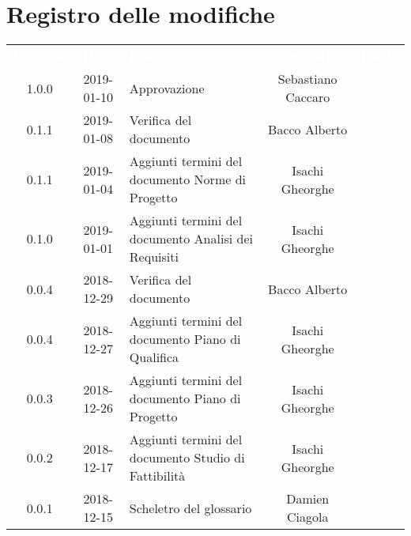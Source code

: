 
\section*{Registro delle modifiche}
{
	\renewcommand{\arraystretch}{1.5}
	\centering
	\begin{longtable}{ c c  C{4cm}  c  c }
		
		\textcolor{white}{\textbf{Versione}} & \textcolor{white}{\textbf{Data}} & \textcolor{white}{\textbf{Descrizione}} & \textcolor{white}{\textbf{Nominativo}} & \textcolor{white}{\textbf{Ruolo}}\\
		
		1.0.0 & 2019-01-10 & Approvazione & Sebastiano Caccaro & \Res{}\\
						
		0.1.1 & 2019-01-08 & Verifica del documento & Bacco Alberto & \ver{}\\
		
		0.1.1 & 2019-01-04 & Aggiunti termini del documento Norme di Progetto & Isachi Gheorghe &\ana{}\\
		
		0.1.0 & 2019-01-01 & Aggiunti termini del documento Analisi dei Requisiti & Isachi Gheorghe &\ana{}\\
		
		0.0.4 & 2018-12-29 & Verifica del documento & Bacco Alberto & \ver{}\\
				
		0.0.4 & 2018-12-27 & Aggiunti termini del documento Piano di Qualifica & Isachi Gheorghe &\ana{}\\
				
		0.0.3 & 2018-12-26 &Aggiunti termini del documento Piano di Progetto & Isachi Gheorghe & \ana{}\\
				
		0.0.2 & 2018-12-17 & Aggiunti termini del documento Studio di Fattibilità & Isachi Gheorghe &\ana{}\\
		
		0.0.1 & 2018-12-15 & Scheletro del glossario & Damien Ciagola & \ana{}\\
		
	\end{longtable}

}